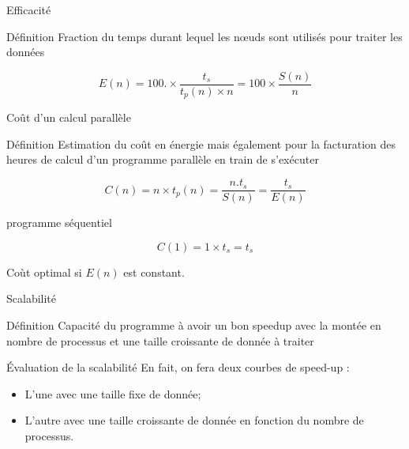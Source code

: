 \documentclass[handout]{beamer}
\begin{document}
\begin{frame}[fragile]{Efficacité}

\begin{block}{Définition}
Fraction du temps durant lequel les n{\oe}uds sont utilisés pour traiter les données

\begin{equation}
 E(n) = 100.\times \frac{t_{s}}{t_{p}(n)\times n} = 100\times\frac{S(n)}{n}
\end{equation}
\end{block}

\end{frame}

\begin{frame}[fragile]{Coût d'un calcul parallèle}

\begin{block}{Définition}
Estimation du coût en énergie mais également pour la facturation des heures
de calcul d'un programme parallèle en train de s'exécuter

\begin{equation}
 C(n) = n \times t_{p}(n) = \frac{n.t_{s}}{S(n)} = \frac{t_{s}}{E(n)}
\end{equation}
\end{block}

\begin{block}{programme séquentiel}

\begin{equation}
 C(1) = 1 \times t_{s} = t_{s}
\end{equation}

\end{block}

Coùt optimal si $E(n)$ est constant.
\end{frame}

\begin{frame}[fragile]{Scalabilité}

\begin{block}{Définition}
Capacité du programme à avoir un bon speedup avec la montée en nombre de processus et
une taille croissante de donnée à traiter
\end{block}

\begin{block}{\'Evaluation de la scalabilité}
En fait, on fera deux courbes de speed-up :
\begin{itemize}
\item L'une avec une taille fixe de donnée;
\item L'autre avec une taille croissante de donnée en fonction du nombre
de processus.
\end{itemize}
\end{block}
\end{frame}
\end{document}
